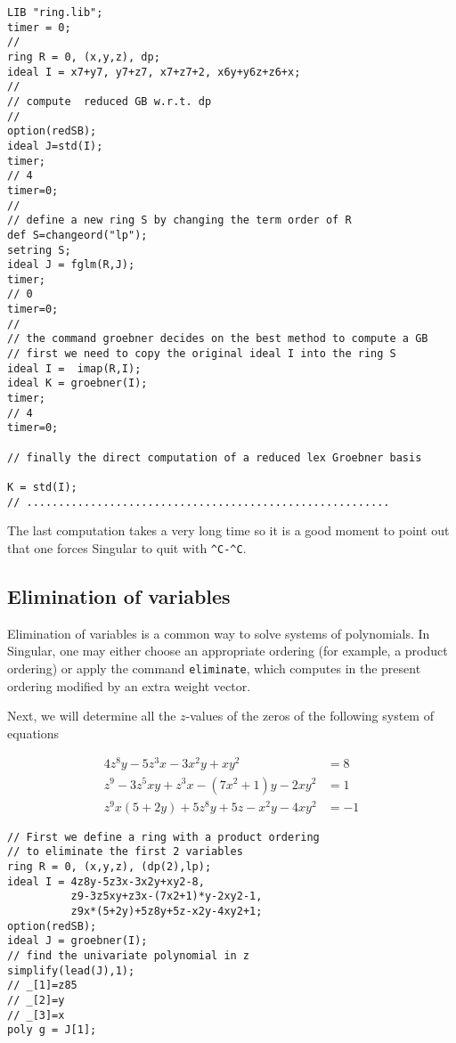 \documentclass[12pt]{amsart}
\begin{document}
\begin{verbatim}
LIB "ring.lib";
timer = 0;
//
ring R = 0, (x,y,z), dp;
ideal I = x7+y7, y7+z7, x7+z7+2, x6y+y6z+z6+x;
//
// compute  reduced GB w.r.t. dp
//
option(redSB);
ideal J=std(I);
timer;
// 4
timer=0;
//
// define a new ring S by changing the term order of R 
def S=changeord("lp");
setring S;
ideal J = fglm(R,J);
timer;
// 0
timer=0;
//
// the command groebner decides on the best method to compute a GB
// first we need to copy the original ideal I into the ring S
ideal I =  imap(R,I);
ideal K = groebner(I);
timer;
// 4
timer=0;

// finally the direct computation of a reduced lex Groebner basis  

K = std(I);
// .........................................................
\end{verbatim}

The last computation takes a very long time so it is a good moment to point out
that one forces Singular to quit with \verb+^C-^C+. 

\subsection{Elimination of variables}

Elimination of variables is a common way to solve systems of polynomials.
In Singular, one may either choose an appropriate ordering (for example, a product
ordering) or apply the command \texttt{eliminate}, which computes in the
present ordering modified by an extra weight vector.

Next, we will determine all the $z$-values of the zeros
of the following system of equations

\begin{align*}
4z^{8}y - 5z^{3}x - 3x^{2}y + xy^{2} &= 8\\
z^{9} - 3z^{5}xy+z^{3}x-(7x^{2}+1)y-2xy^{2} &= 1\\
z^{9}x(5+2y)+5z^{8}y+5z-x^{2}y-4xy^{2} &= -1
\end{align*}

\begin{verbatim}
// First we define a ring with a product ordering
// to eliminate the first 2 variables
ring R = 0, (x,y,z), (dp(2),lp);
ideal I = 4z8y-5z3x-3x2y+xy2-8,
          z9-3z5xy+z3x-(7x2+1)*y-2xy2-1,
          z9x*(5+2y)+5z8y+5z-x2y-4xy2+1;
option(redSB);
ideal J = groebner(I);
// find the univariate polynomial in z
simplify(lead(J),1);
// _[1]=z85
// _[2]=y
// _[3]=x
poly g = J[1];
\end{verbatim}
\end{document}
